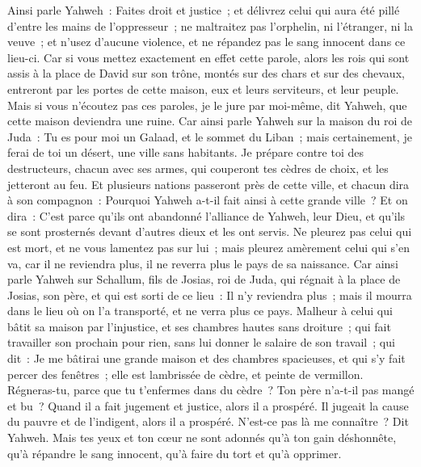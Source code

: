\begin{multicols}{2}
Ainsi parle Yahweh~: Faites droit et justice~; et délivrez celui qui aura été pillé d'entre les mains de l'oppresseur~; ne maltraitez pas l'orphelin, ni l'étranger, ni la veuve~; et n'usez d'aucune violence, et ne répandez pas le sang innocent dans ce lieu-ci.
Car si vous mettez exactement en effet cette parole, alors les rois qui sont assis à la place de David sur son trône, montés sur des chars et sur des chevaux, entreront par les portes de cette maison, eux et leurs serviteurs, et leur peuple.
Mais si vous n'écoutez pas ces paroles, je le jure par moi-même, dit Yahweh, que cette maison deviendra une ruine.
Car ainsi parle Yahweh sur la maison du roi de Juda~: Tu es pour moi un Galaad, et le sommet du Liban~; mais certainement, je ferai de toi un désert, une ville sans habitants.
Je prépare contre toi des destructeurs, chacun avec ses armes, qui couperont tes cèdres de choix, et les jetteront au feu.
Et plusieurs nations passeront près de cette ville, et chacun dira à son compagnon~: Pourquoi Yahweh a-t-il fait ainsi à cette grande ville~?
Et on dira~: C'est parce qu'ils ont abandonné l'alliance de Yahweh, leur Dieu, et qu'ils se sont prosternés devant d'autres dieux et les ont servis.
Ne pleurez pas celui qui est mort, et ne vous lamentez pas sur lui~; mais pleurez amèrement celui qui s'en va, car il ne reviendra plus, il ne reverra plus le pays de sa naissance.
Car ainsi parle Yahweh sur Schallum, fils de Josias, roi de Juda, qui régnait à la place de Josias, son père, et qui est sorti de ce lieu~: Il n'y reviendra plus~;
mais il mourra dans le lieu où on l'a transporté, et ne verra plus ce pays.
Malheur à celui qui bâtit sa maison par l'injustice, et ses chambres hautes sans droiture~; qui fait travailler son prochain pour rien, sans lui donner le salaire de son travail~;
qui dit~: Je me bâtirai une grande maison et des chambres spacieuses, et qui s'y fait percer des fenêtres~; elle est lambrissée de cèdre, et peinte de vermillon.
Régneras-tu, parce que tu t'enfermes dans du cèdre~? Ton père n'a-t-il pas mangé et bu~? Quand il a fait jugement et justice, alors il a prospéré.
Il jugeait la cause du pauvre et de l'indigent, alors il a prospéré. N'est-ce pas là me connaître~? Dit Yahweh.
Mais tes yeux et ton cœur ne sont adonnés qu'à ton gain déshonnête, qu'à répandre le sang innocent, qu'à faire du tort et qu'à opprimer.

\end{multicols}
